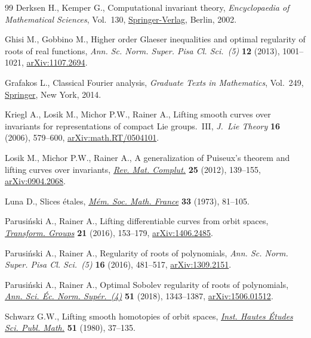 \documentclass[11pt]{article}
\numberwithin{equation}{section}
\numberwithin{equation}{section}
\begin{document}
\begin{thebibliography}{99}
Derksen H., Kemper G., Computational invariant theory, \textit{Encyclopaedia of
 Mathematical Sciences}, Vol.~130, \href{https://doi.org/10.1007/978-3-662-04958-7}{Springer-Verlag}, Berlin, 2002.

Ghisi M., Gobbino M., Higher order {G}laeser inequalities and optimal
 regularity of roots of real functions, \textit{Ann. Sc. Norm. Super. Pisa Cl.
 Sci.~(5)} \textbf{12} (2013), 1001--1021, \href{https://arxiv.org/abs/1107.2694}{arXiv:1107.2694}.

Grafakos L., Classical {F}ourier analysis, \textit{Graduate Texts in
 Mathematics}, Vol.~249, \href{https://doi.org/10.1007/978-1-4939-1194-3}{Springer}, New York, 2014.

Kriegl A., Losik M., Michor P.W., Rainer A., Lifting smooth curves over
 invariants for representations of compact {L}ie groups.~{III}, \textit{J.~Lie
 Theory} \textbf{16} (2006), 579--600, \href{https://arxiv.org/abs/math.RT/0504101}{arXiv:math.RT/0504101}.

Losik M., Michor P.W., Rainer A., A generalization of {P}uiseux's theorem and
 lifting curves over invariants, \href{https://doi.org/10.1007/s13163-011-0062-y}{\textit{Rev. Mat. Complut.}} \textbf{25}
 (2012), 139--155, \href{https://arxiv.org/abs/0904.2068}{arXiv:0904.2068}.

Luna D., Slices \'etales, \href{https://doi.org/10.24033/msmf.110}{\textit{M\'em. Soc. Math. France}} \textbf{33} (1973),
 81--105.

Parusi\'nski A., Rainer A., Lifting differentiable curves from orbit spaces,
 \href{https://doi.org/10.1007/s00031-015-9346-5}{\textit{Transform. Groups}} \textbf{21} (2016), 153--179, \href{https://arxiv.org/abs/1406.2485}{arXiv:1406.2485}.

Parusi\'nski A., Rainer A., Regularity of roots of polynomials, \textit{Ann.
 Sc. Norm. Super. Pisa Cl. Sci.~(5)} \textbf{16} (2016), 481--517,
 \href{https://arxiv.org/abs/1309.2151}{arXiv:1309.2151}.

Parusi\'nski A., Rainer A., Optimal {S}obolev regularity of roots of
 polynomials, \href{https://doi.org/10.24033/asens.2376}{\textit{Ann. Sci. \'Ec. Norm. Sup\'er.~(4)}} \textbf{51} (2018),
 1343--1387, \href{https://arxiv.org/abs/1506.01512}{arXiv:1506.01512}.

Schwarz G.W., Lifting smooth homotopies of orbit spaces, \href{https://doi.org/10.1007/BF02684776}{\textit{Inst. Hautes
 \'Etudes Sci. Publ. Math.}} \textbf{51} (1980), 37--135.

\end{thebibliography}
\end{document}
